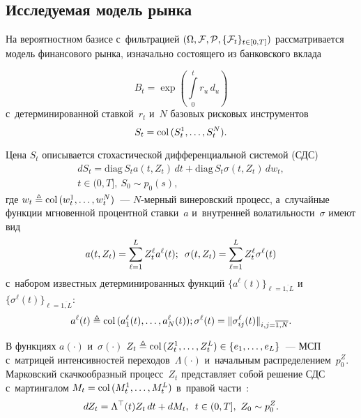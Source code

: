 \begin{multicols}{2}
\vspace*{-2pt}

\section{Исследуемая модель рынка}

На вероятностном базисе с~фильтрацией $(\Omega, {\mathcal F}, {\mathcal P}, \{{\mathcal F}_t\}_{t \in [0,T]})$ рассматривается модель финансового рынка, изначально состоящего
из банковского вклада 

\noindent
$$
B_t = \exp \left( \int\limits_0^t r_u\,d_u\right)
$$ 
с~детерминированной ставкой~$r_t$
и~$N$ базовых рисковых инструментов 
$$
S_t = \mathop{\mathrm{col}}\,(S_t^1,\ldots,S_t^N).
$$

Цена $S_t $  описывается стохастической дифференциальной сис\-те\-мой (СДС)
  \begin{multline}
  dS_t = \mathrm{diag}\, S_t a(t,Z_t)\,dt + \mathrm{diag}\, S_t \sigma(t,Z_t)\,dw_t,\\
   t \in (0,T], \ S_0 \sim p_0(s),
  \label{eq:S_sys_P}
  \end{multline}
  где $w_t \triangleq \mathop{\mathrm{col}}\, (w_t^1,\ldots,w_t^N)$~--- $N$-мер\-ный винеровский процесс, 
  а~случайные функции мгновенной процентной ставки~$a$ и~внутренней во\-ла\-тиль\-ности~$\sigma$  имеют вид
  $$
  a(t,Z_t) = \sum\limits_{\ell=1}^L Z_t^{\ell} a^{\ell}(t);\enskip
  \sigma(t,Z_t) = \sum\limits_{\ell=1}^L Z_t^{\ell}  \sigma^{\ell}(t)
  $$
с~набором известных детерминированных функций $\{ a^{\ell}(t)\}_{\ell=\overline{1,L}}$  и~$\{\sigma^{\ell}(t)\}_{\ell=\overline{1,L}}$: 
$$
a^{\ell}(t) \triangleq \mathop{\mathrm{col}}\,(a_1^{\ell}(t), \ldots,a_N^{\ell}(t) );
\sigma^{\ell}(t) = \|\sigma_{ij}^{\ell}(t)\|_{i,j=\overline{1,N}}.
$$


В функциях $a(\cdot)$ и~$\sigma(\cdot)$  $Z_t \triangleq \col(Z_t^1, \ldots, Z_t^L) \hm\in \{e_1,\ldots, e_L\}$~--- МСП 
с~мат\-ри\-цей интенсивностей переходов~$\Lambda(\cdot)$ и~начальным распределением~$p_0^Z$. 
Марковский скачкообразный процесс~$Z_t$ пред\-став\-ля\-ет собой решение СДС с~мартингалом $M_t \hm= \col(M_t^1, \ldots, M_t^L)$ в~правой части~\cite{ElliottAggounMoore_08}:
\begin{equation}
  dZ_t = \Lambda^{\top}(t)Z_t\,dt + dM_t,\enskip t \in (0,T], \ Z_0 \sim p_0^Z.
  \label{eq:Z_sys}
  \end{equation}


\end{multicols}
